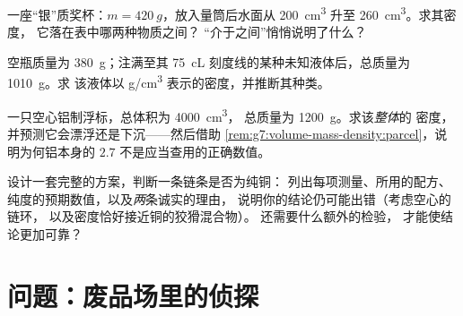 \begin{exercise}[$\star\star$]\label{exo:g7:volume-mass-density:9}
一座“银”质奖杯：$m = \qty{420}{g}$，放入量筒后水面从
\qty{200}{cm^3} 升至 \qty{260}{cm^3}。求其密度，
它落在表中哪两种物质之间？
“介于之间”悄悄说明了什么？
\end{exercise}

\begin{exercise}[$\star\star$]\label{exo:g7:volume-mass-density:10}
空瓶质量为 \qty{380}{g}；注满至其 \qty{75}{cL}
刻度线的某种未知液体后，总质量为 \qty{1010}{g}。求
该液体以 \unit{g/cm^3} 表示的密度，并推断其种类。
\end{exercise}

\begin{exercise}[$\star\star$]\label{exo:g7:volume-mass-density:11}
一只空心铝制浮标，总体积为 \qty{4000}{cm^3}，
总质量为 \qty{1200}{g}。求该\emph{整体}的
密度，并预测它会漂浮还是下沉——然后借助
\cref{rem:g7:volume-mass-density:parcel}，说明为何铝本身的
$2.7$ 不是应当查用的正确数值。
\end{exercise}

\begin{exercise}[$\star\star\star$]\label{exo:g7:volume-mass-density:12}
设计一套完整的方案，判断一条链条是否为纯铜：
列出每项测量、所用的配方、纯度的预期数值，以及\emph{两}条诚实的理由，
说明你的结论仍可能出错（考虑空心的链环，
以及密度恰好接近铜的狡猾混合物）。
还需要什么额外的检验，
才能使结论更加可靠？
\end{exercise}

\section{问题：废品场里的侦探}

